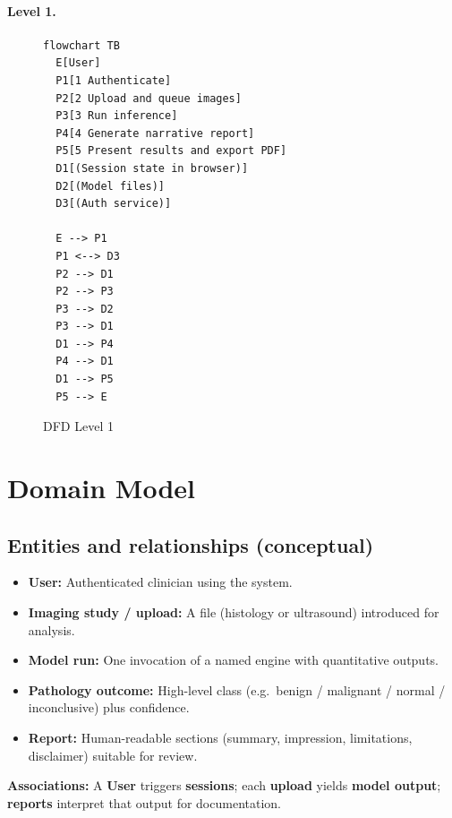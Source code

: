 \paragraph{Level 1.}

\begin{figure}[htbp]
  \centering
  \begin{minipage}{0.92\textwidth}
  \begin{lstlisting}
flowchart TB
  E[User]
  P1[1 Authenticate]
  P2[2 Upload and queue images]
  P3[3 Run inference]
  P4[4 Generate narrative report]
  P5[5 Present results and export PDF]
  D1[(Session state in browser)]
  D2[(Model files)]
  D3[(Auth service)]

  E --> P1
  P1 <--> D3
  P2 --> D1
  P2 --> P3
  P3 --> D2
  P3 --> D1
  D1 --> P4
  P4 --> D1
  D1 --> P5
  P5 --> E
  \end{lstlisting}
  \end{minipage}
  \caption{DFD Level 1}
\end{figure}

\section{Domain Model}
\label{sec:domain}

\subsection{Entities and relationships (conceptual)}

\begin{itemize}
  \item \textbf{User:} Authenticated clinician using the system.
  \item \textbf{Imaging study / upload:} A file (histology or ultrasound) introduced for analysis.
  \item \textbf{Model run:} One invocation of a named engine with quantitative outputs.
  \item \textbf{Pathology outcome:} High-level class (e.g.\ benign / malignant / normal / inconclusive) plus confidence.
  \item \textbf{Report:} Human-readable sections (summary, impression, limitations, disclaimer) suitable for review.
\end{itemize}

\textbf{Associations:} A \textbf{User} triggers \textbf{sessions}; each \textbf{upload} yields \textbf{model output}; \textbf{reports} interpret that output for documentation.


